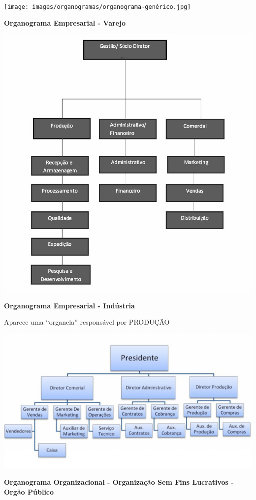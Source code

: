 \documentclass[
]{book}
\begin{document}
\texttt{[image: images/organogramas/organograma-genérico.jpg]}

\textbf{Organograma Empresarial - Varejo}

\includegraphics{images/organogramas/Organograma-empresarial.jpg}

\textbf{Organograma Empresarial - Indústria}

Aparece uma ``organela'' responsável por PRODUÇÃO

\includegraphics{images/organogramas/OrganogramaIndustrial.jpg}

\textbf{Organograma Organizacional - Organização Sem Fins Lucrativos - Orgão Público}
\end{document}

